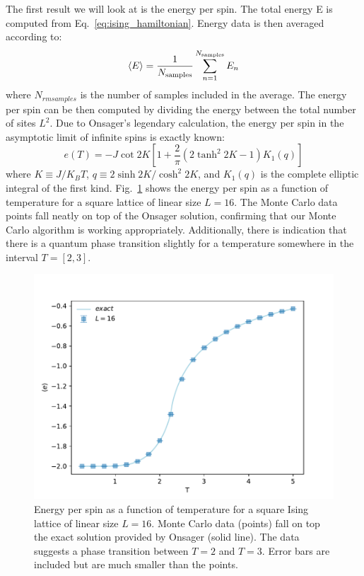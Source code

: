 \documentclass[12pt]{article}
\newcommand{\figref}[1]{Fig.~\ref{#1}}
\begin{document}
The first result we will look at is the energy per spin. The total energy E is computed from Eq.~\eqref{eq:ising_hamiltonian}. Energy data is then averaged according to:
%
\begin{equation}
\langle E \rangle = \frac{1}{N_{\rm{samples}}} \sum_{n=1}^{N_{\rm{samples}}} E_n
\end{equation}
%
where $N_{rm{samples}}$ is the number of samples included in the average. The energy per spin can be then computed by dividing the energy between the total number of sites $L^2$. Due to Onsager's legendary calculation, the energy per spin in the asymptotic limit of infinite spins is exactly known:
%
\begin{equation}
e(T) = -J \cot 2K [ 1 + \frac{2}{\pi} (2 \tanh^2 2K - 1)K_1(q)]
\label{eq:e_exact}
\end{equation}
%
where $K\equiv J/K_BT$, $q \equiv 2 \sinh 2K / \cosh^2 2K$, and $K_1(q)$ is the complete elliptic integral of the first kind. \figref{fig:internal_energy} shows the energy per spin as a function of temperature for a square lattice of linear size $L=16$. The Monte Carlo data points fall neatly on top of the Onsager solution, confirming that our Monte Carlo algorithm is working appropriately. Additionally, there is indication that there is a quantum phase transition slightly for a temperature somewhere in the interval $T=[2,3]$.

\begin{figure}[t]
\begin{center}
\includegraphics[width=0.7\columnwidth]{../Figures/b_e_per_spin}
\end{center}
\caption{Energy per spin as a function of temperature for a square Ising lattice of linear size $L=16$. Monte Carlo data (points) fall on top the exact solution provided by Onsager (solid line). The data suggests a phase transition between $T=2$ and $T=3$. Error bars are included but are much smaller than the points.}
\label{fig:internal_energy}
\end{figure}
\end{document}
